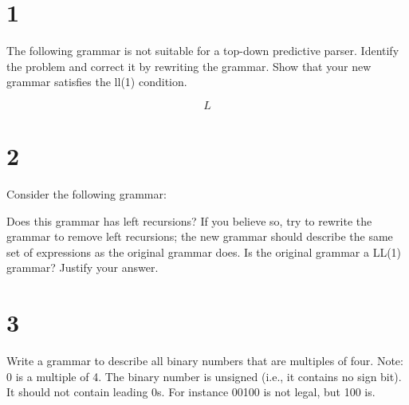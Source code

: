 \documentclass[11pt]{article}
\begin{document}
\section*{1}
The following grammar is not suitable for a top-down predictive parser. Identify the problem and correct it by rewriting the grammar. Show that your new grammar satisfies the ll(1) condition.

$$L$$

\begin{Answer}

\end{Answer}

\newpage

\section*{2}
Consider the following grammar:

\begin{Parts}
	\Part Does this grammar has left recursions? If you believe so, try to rewrite the grammar to remove left recursions; the new grammar should describe the same set of expressions as the original grammar does.
	\Part Is the original grammar a LL(1) grammar? Justify your answer.
\end{Parts}
	
\newpage

\section*{3}
Write a grammar to describe all binary numbers that are multiples of four. Note:
0 is a multiple of 4.
The binary number is unsigned (i.e., it contains no sign bit).
It should not contain leading 0s. For instance 00100 is not legal, but 100 is.
\newpage
\end{document}
